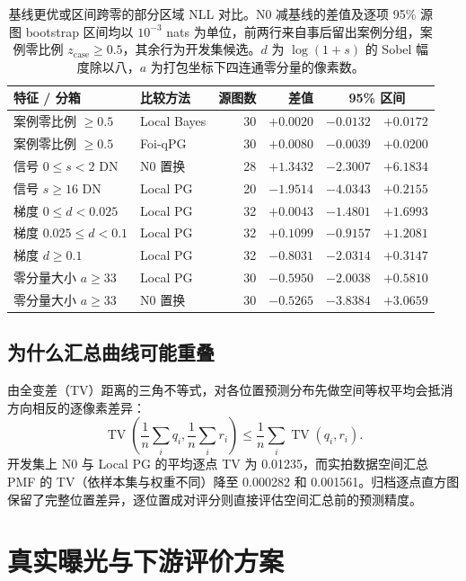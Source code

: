 \documentclass[10pt,twocolumn,journal]{IEEEtran}
\DeclareMathOperator{\TV}{TV}
\begin{document}
\begin{table}[t]
\centering
\caption{基线更优或区间跨零的部分区域 NLL 对比。N0 减基线的差值及逐项 95\% 源图 bootstrap 区间均以 $10^{-3}$ nats 为单位，前两行来自事后留出案例分组，案例零比例 $z_{\mathrm{case}}\geq0.5$，其余行为开发集候选。$d$ 为 $\log(1+s)$ 的 Sobel 幅度除以八，$a$ 为打包坐标下四连通零分量的像素数。}
\label{tab:adverse}
\begin{tabular}{@{}llrrrr@{}}
\toprule
特征 / 分箱 & 比较方法 & 源图数 & 差值 & \multicolumn{2}{c}{95\% 区间}\\
\midrule
案例零比例 $\geq0.5$ & Local Bayes & 30 & $+0.0020$ & $-0.0132$ & $+0.0172$\\
案例零比例 $\geq0.5$ & Foi-qPG & 30 & $+0.0080$ & $-0.0039$ & $+0.0200$\\
信号 $0\leq s<2$ DN & N0 置换 & 28 & $+1.3432$ & $-2.3007$ & $+6.1834$\\
信号 $s\geq16$ DN & Local PG & 20 & $-1.9514$ & $-4.0343$ & $+0.2155$\\
梯度 $0\leq d<0.025$ & Local PG & 32 & $+0.0043$ & $-1.4801$ & $+1.6993$\\
梯度 $0.025\leq d<0.1$ & Local PG & 32 & $+0.1099$ & $-0.9157$ & $+1.2081$\\
梯度 $d\geq0.1$ & Local PG & 32 & $-0.8031$ & $-2.0314$ & $+0.3147$\\
零分量大小 $a\geq33$ & Local PG & 30 & $-0.5950$ & $-2.0038$ & $+0.5810$\\
零分量大小 $a\geq33$ & N0 置换 & 30 & $-0.5265$ & $-3.8384$ & $+3.0659$\\
\bottomrule
\end{tabular}
\end{table}

\subsection{为什么汇总曲线可能重叠}
由全变差（TV）距离的三角不等式，对各位置预测分布先做空间等权平均会抵消方向相反的逐像素差异：
\begin{equation}
\TV\!\left(\frac1n\sum_iq_i,\frac1n\sum_ir_i\right)
\leq\frac1n\sum_i\TV(q_i,r_i).
\end{equation}
开发集上 N0 与 Local PG 的平均逐点 TV 为 0.01235，而实拍数据空间汇总 PMF 的 TV（依样本集与权重不同）降至 0.000282 和 0.001561。归档逐点直方图保留了完整位置差异，逐位置成对评分则直接评估空间汇总前的预测精度。

\section{真实曝光与下游评价方案}
\end{document}
